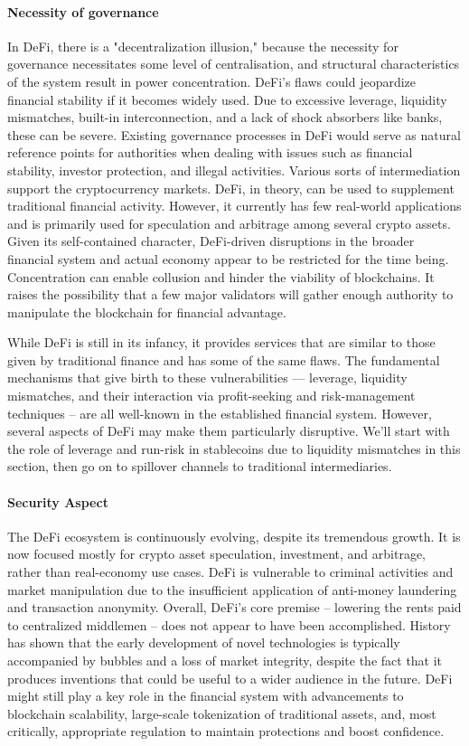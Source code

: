 \documentclass[10pt,twocolumn]{article}
\begin{document}
\paragraph{Necessity of governance}

In DeFi, there is a "decentralization illusion," because the necessity for governance necessitates some level of centralisation, and structural characteristics of the system result in power concentration. DeFi's flaws could jeopardize financial stability if it becomes widely used. Due to excessive leverage, liquidity mismatches, built-in interconnection, and a lack of shock absorbers like banks, these can be severe. Existing governance processes in DeFi would serve as natural reference points for authorities when dealing with issues such as financial stability, investor protection, and illegal activities. Various sorts of intermediation support the cryptocurrency markets. DeFi, in theory, can be used to supplement traditional financial activity.
However, it currently has few real-world applications and is primarily used for speculation and arbitrage among several crypto assets. Given its self-contained character, DeFi-driven disruptions in the broader financial system and actual economy appear to be restricted for the time being. Concentration can enable collusion and hinder the viability of blockchains. It raises the possibility that a few major validators will gather enough authority to manipulate the blockchain for financial advantage. 

While DeFi is still in its infancy, it provides services that are similar to those given by traditional finance and has some of the same flaws. The fundamental mechanisms that give birth to these vulnerabilities — leverage, liquidity mismatches, and their interaction via profit-seeking and risk-management techniques – are all well-known in the established financial system. However, several aspects of DeFi may make them particularly disruptive. We'll start with the role of leverage and run-risk in stablecoins due to liquidity mismatches in this section, then go on to spillover channels to traditional intermediaries.
\paragraph{Security Aspect}

The DeFi ecosystem is continuously evolving, despite its tremendous growth. It is now focused mostly for crypto asset speculation, investment, and arbitrage, rather than real-economy use cases. DeFi is vulnerable to criminal activities and market manipulation due to the insufficient application of anti-money laundering and transaction anonymity. Overall, DeFi's core premise – lowering the rents paid to centralized middlemen – does not appear to have been accomplished.\cite{Fletcher}
History has shown that the early development of novel technologies is typically accompanied by bubbles and a loss of market integrity, despite the fact that it produces inventions that could be useful to a wider audience in the future. DeFi might still play a key role in the financial system with advancements to blockchain scalability, large-scale tokenization of traditional assets, and, most critically, appropriate regulation to maintain protections and boost confidence.
\end{document}
